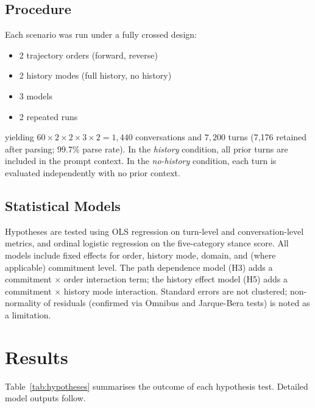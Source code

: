 \documentclass[11pt]{article}
\begin{document}
\subsection{Procedure}

Each scenario was run under a fully crossed design:
\begin{itemize}
    \item 2 trajectory orders (forward, reverse)
    \item 2 history modes (full history, no history)
    \item 3 models
    \item 2 repeated runs
\end{itemize}
yielding $60 \times 2 \times 2 \times 3 \times 2 = 1{,}440$ conversations and $7{,}200$ turns (7,176 retained after parsing; 99.7\% parse rate). In the \emph{history} condition, all prior turns are included in the prompt context. In the \emph{no-history} condition, each turn is evaluated independently with no prior context.

\subsection{Statistical Models}

Hypotheses are tested using OLS regression on turn-level and conversation-level metrics, and ordinal logistic regression on the five-category stance score. All models include fixed effects for order, history mode, domain, and (where applicable) commitment level. The path dependence model (H3) adds a commitment $\times$ order interaction term; the history effect model (H5) adds a commitment $\times$ history mode interaction. Standard errors are not clustered; non-normality of residuals (confirmed via Omnibus and Jarque-Bera tests) is noted as a limitation.


\section{Results}

Table~\ref{tab:hypotheses} summarises the outcome of each hypothesis test. Detailed model outputs follow.
\end{document}
